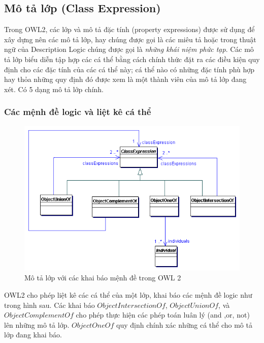 \subsection{Mô tả lớp (Class Expression)}
Trong OWL2, các lớp và mô tả đặc tính (property expressions) được sử dụng để xây dựng nên các mô tả lớp, hay chúng được gọi là các miêu tả hoặc trong thuật ngữ của Description Logic chúng được gọi là \textit{những khái niệm phức tạp}. Các mô tả lớp 
biểu diễn tập hợp các cá thể bằng cách chính thức đặt ra các điều kiện quy định cho các đặc tính của các cá thể này; cá thể nào có những đặc tính phù hợp hay thỏa những quy định đó được xem là một thành viên của mô tả lớp đang xét. Có 5 dạng mô tả lớp chính.
\subsubsection{Các mệnh đề logic và liệt kê cá thể}
\begin{figure}[h!]
	\centering
	\includegraphics[width=120mm]{Figures/ce_0.png}
	\caption{Mô tả lớp với các khai báo mệnh đề trong OWL 2\label{overflow}}
\end{figure}
OWL2 cho phép liệt kê các cá thể của một lớp, khai báo các mệnh đề logic như trong hình sau. Các khai báo $ObjectIntersectionOf$, $ObjectUnionOf$, và $ObjectComplementOf$ cho phép thực hiện các phép toán luân lý (and ,or, not) lên những mô tả lớp. $ObjectOneOf$ quy định chính xác những cá thể cho mô tả lớp đang khai báo.
